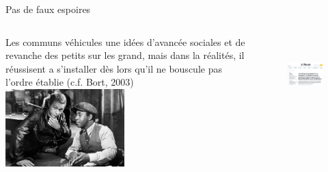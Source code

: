 \documentclass[newPxFont]{beamer}
\begin{document}
\begin{frame}[c]{Pas de faux espoires}
\vspace{-1cm}
\begin{columns}[onlytextwidth,T]
  \column{\dimexpr\linewidth-30mm-5mm}
  \small{Les communs véhicules une idées d'avancée sociales et de revanche des petits sur les grand, mais dans la réalités, il réussisent a s'installer dès lors qu'il ne bouscule pas l'ordre établie (c.f. Bort, 2003)}\\
  \vspace{0.5cm}
  \includegraphics[height=3cm]{img/thecincinnatiKid.jpg}

  \column{35mm}
  \begin{figure}
    \includegraphics[height=3cm]{img/leMonde301023.png}
  \end{figure}

\end{columns}
\end{frame}
\end{document}
